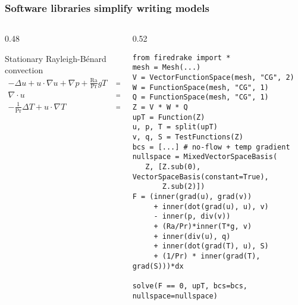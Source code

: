 \documentclass[presentation]{beamer}
\begin{document}
\begin{frame}[fragile]
  \frametitle{Software libraries simplify writing models}
  \begin{columns}
    \begin{column}{0.48\framewidth}
      \begin{block}{Stationary Rayleigh-B\'enard convection}
        \begin{equation*}
          \begin{split}
            -\Delta u + u\cdot\nabla u + \nabla p +
            \frac{\text{Ra}}{\text{Pr}} \hat{g}T &= 0 \\
            \nabla \cdot u &= 0 \\
            - \frac{1}{\text{Pr}} \Delta T + u\cdot \nabla T &= 0
          \end{split}
        \end{equation*}
      \end{block}
    \end{column}
    \begin{column}{0.52\framewidth}
\begin{verbatim}
from firedrake import *
mesh = Mesh(...)
V = VectorFunctionSpace(mesh, "CG", 2)
W = FunctionSpace(mesh, "CG", 1)
Q = FunctionSpace(mesh, "CG", 1)
Z = V * W * Q
upT = Function(Z)
u, p, T = split(upT)
v, q, S = TestFunctions(Z)
bcs = [...] # no-flow + temp gradient
nullspace = MixedVectorSpaceBasis(
   Z, [Z.sub(0), VectorSpaceBasis(constant=True), 
       Z.sub(2)])
F = (inner(grad(u), grad(v))
     + inner(dot(grad(u), u), v)
     - inner(p, div(v))
     + (Ra/Pr)*inner(T*g, v)
     + inner(div(u), q)
     + inner(dot(grad(T), u), S)
     + (1/Pr) * inner(grad(T), grad(S)))*dx

solve(F == 0, upT, bcs=bcs, nullspace=nullspace)
\end{verbatim}
    \end{column}
  \end{columns}
\end{frame}
\end{document}
